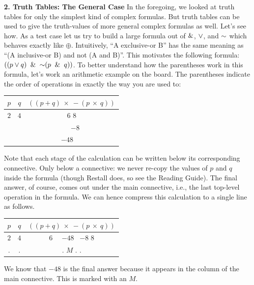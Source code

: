 \documentclass[options]{philosophersimprint}
\theoremstyle{definition}
\begin{document}
\textbf{2. Truth Tables: The General Case} In the foregoing, we looked at truth tables for only the simplest kind of complex formulas. But truth tables can be used to give the truth-values of more general complex formulas as well. Let's see how. As a test case let us try to build a large formula out of $\mathbin{\&}$, $\mathbin{\vee}$, and $\mathord{\sim}$ which behaves exactly like $\oplus$. Intuitively, ``A exclusive-or B'' has the same meaning as ``(A inclusive-or B) and not (A and B)''. This motivates the following formula: $((p \mathbin{\vee} q) \ \mathbin{\&} \  \mathord{\sim} (p \ \mathbin{\&} \  q))$. To better understand how the parentheses work in this formula, let's work an arithmetic example on the board. The parentheses indicate the order of operations in exactly the way you are used to:
\begin{table}[h!]
\centering
\begin{tabular}{c c | c }
    $p$ & $q$ & $((p + q) \ \times \ - (p \ \times \ q))$ \\
    \hline
     $2$ & $4$ & $6$ \quad \quad \quad \quad \quad $8$\\
      &  &  \quad \quad \ \ $-8$\\
      &  &  $-48$ \quad \ \
    \end{tabular}
\end{table}

Note that each stage of the calculation can be written below its corresponding connective. Only below a connective: we never re-copy the values of $p$ and $q$ inside the formula (though Restall does, so see the Reading Guide). The final answer, of course, comes out under the main connective, i.e., the last top-level operation in the formula. We can hence compress this calculation to a single line as follows.
\begin{table}[h!]
\centering
\begin{tabular}{c c | c }
    $p$ & $q$ & $((p + q) \ \times \ - (p \ \times \ q))$ \\
    \hline
     $2$ & $4$ & $6$ \ \ $-48$ \ $-8$ \quad $8$\\
     \hline
     $.$ & $.$ & $.$ \quad $M$ \quad $.$ \quad $.$\\
    \end{tabular}
\end{table}

We know that $-48$ is the final answer because it appears in the column of the main connective. This is marked with an $M$.
\end{document}
